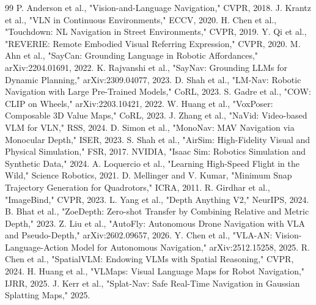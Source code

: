 \documentclass[conference]{IEEEtran}
\begin{document}
\begin{thebibliography}{99}
 P. Anderson et al., "Vision-and-Language Navigation," CVPR, 2018.
 J. Krantz et al., "VLN in Continuous Environments," ECCV, 2020.
 H. Chen et al., "Touchdown: NL Navigation in Street Environments," CVPR, 2019.
 Y. Qi et al., "REVERIE: Remote Embodied Visual Referring Expression," CVPR, 2020.
 M. Ahn et al., "SayCan: Grounding Language in Robotic Affordances," arXiv:2204.01691, 2022.
 K. Rajvanshi et al., "SayNav: Grounding LLMs for Dynamic Planning," arXiv:2309.04077, 2023.
 D. Shah et al., "LM-Nav: Robotic Navigation with Large Pre-Trained Models," CoRL, 2023.
 S. Gadre et al., "COW: CLIP on Wheels," arXiv:2203.10421, 2022.
 W. Huang et al., "VoxPoser: Composable 3D Value Maps," CoRL, 2023.
 J. Zhang et al., "NaVid: Video-based VLM for VLN," RSS, 2024.
 D. Simon et al., "MonoNav: MAV Navigation via Monocular Depth," ISER, 2023.
 S. Shah et al., "AirSim: High-Fidelity Visual and Physical Simulation," FSR, 2017.
 NVIDIA, "Isaac Sim: Robotics Simulation and Synthetic Data," 2024.
 A. Loquercio et al., "Learning High-Speed Flight in the Wild," Science Robotics, 2021.
 D. Mellinger and V. Kumar, "Minimum Snap Trajectory Generation for Quadrotors," ICRA, 2011.
 R. Girdhar et al., "ImageBind," CVPR, 2023.
 L. Yang et al., "Depth Anything V2," NeurIPS, 2024.
 B. Bhat et al., "ZoeDepth: Zero-shot Transfer by Combining Relative and Metric Depth," 2023.
 Z. Liu et al., "AutoFly: Autonomous Drone Navigation with VLA and Pseudo-Depth," arXiv:2602.09657, 2026.
 Y. Chen et al., "VLA-AN: Vision-Language-Action Model for Autonomous Navigation," arXiv:2512.15258, 2025.
 R. Chen et al., "SpatialVLM: Endowing VLMs with Spatial Reasoning," CVPR, 2024.
 H. Huang et al., "VLMaps: Visual Language Maps for Robot Navigation," IJRR, 2025.
 J. Kerr et al., "Splat-Nav: Safe Real-Time Navigation in Gaussian Splatting Maps," 2025.
\end{thebibliography}
\end{document}
